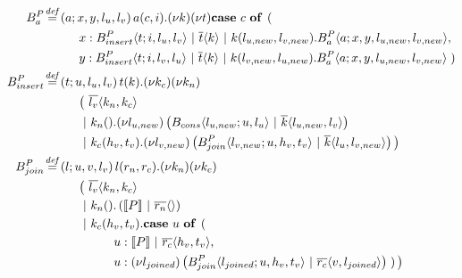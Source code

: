 \begin{align*}
  \adef*{B_a^P}{a}{x,y,l_u,l_v}{
    \arcv{a}{c,i} . \anew{k}{\anew{t}{
      \acse{c}{ \right. \nonumber \\
        & \hspace{1cm}
          \aalt{x}{\ains{B_{insert}^P}{t}{i, l_u, l_v} \apar \asnd{t}{k} \apar \arcv{k}{l_{u,new},l_{v,new}} . \ains{B_a^P}{a}{x, y, l_{u,new}, l_{v,new}}}, \nonumber \\
        & \hspace{1cm}
          \aalt{y}{\ains{B_{insert}^P}{t}{i, l_v, l_u} \apar \asnd{t}{k} \apar \arcv{k}{l_{v,new},l_{u,new}} . \ains{B_a^P}{a}{x, y, l_{u,new}, l_{v,new}}}
    \left.}}}
  } \\
  \adef*{B_{insert}^P}{t}{u,l_u,l_v}{
    \arcv{t}{k} . \anew{k_c}{\anew{k_n}{ \nonumber \\
      & \hspace{1cm}
        \big(\ \asnd{l_v}{k_n,k_c} \nonumber \\
      & \hspace{1cm}
        \apar \arcv{k_n}{} . \anew{l_{u,new}}{\parens{\ains{B_{cons}}{l_{u,new}}{u, l_u} \apar \asnd{k}{l_{u,new},l_v}}} \nonumber \\
      & \hspace{1cm}
        \apar \arcv{k_c}{h_v,t_v} . \anew{l_{v,new}}{\parens{\ains{B_{join}^P}{l_{v,new}}{u, h_v, t_v} \apar \asnd{k}{l_u,l_{v,new}}}} \big)
    }}
  } \\
  \adef*{B_{join}^P}{l}{u,v,l_v}{
    \arcv{l}{r_n,r_c} . \anew{k_n}{\anew{k_c}{ \nonumber \\
      & \hspace{1cm}
        \big(\ \asnd{l_v}{k_n,k_c} \nonumber \\
      & \hspace{1cm}
        \apar \arcv{k_n}{} . \parens{\encMJtoAP{P} \apar \asnd{r_n}{}} \nonumber \\
      & \hspace{1cm}
        \apar \arcv{k_c}{h_v,t_v} . \acse{u}{ \right. \nonumber \\
          & \hspace{2cm}
            \aalt{u}{\encMJtoAP{P} \apar \asnd{r_c}{h_v,t_v}}, \nonumber \\
          & \hspace{2cm}
            \aalt{u}{\anew{l_{joined}}{\parens{\ains{B_{join}^P}{l_{joined}}{u, h_v, t_v} \apar \asnd{r_c}{v,l_{joined}}}}}
        \left.}\big)
    }}
  }
\end{align*}

